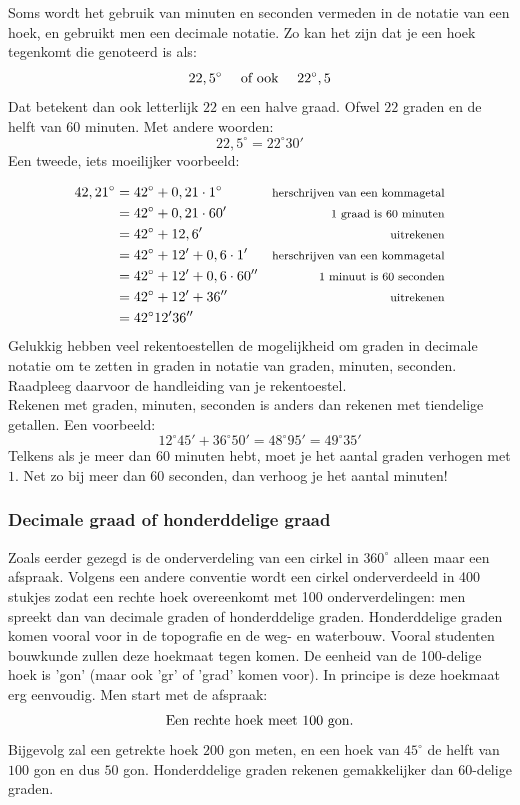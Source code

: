 Soms wordt het gebruik van minuten en seconden vermeden in de notatie van een hoek, en gebruikt men een decimale notatie. Zo kan het zijn dat je een hoek tegenkomt die genoteerd is als:
\[22,5^\circ \quad \textup{ of ook } \quad 22^\circ,5\]
Dat betekent dan ook letterlijk $22$ en een halve graad. Ofwel $22$ graden en de helft van $60$ minuten. Met andere woorden:
\[22,5^\circ = 22^\circ30'\]
Een tweede, iets moeilijker voorbeeld:

\begin{align*}
42,21^\circ &= 42^\circ+0,21\cdot 1^\circ &\textup{\footnotesize herschrijven van een kommagetal}\\
&= 42^\circ + 0,21 \cdot 60' &\textup{\footnotesize 1 graad is 60 minuten}\\
&= 42^\circ + 12,6' &\textup{\footnotesize uitrekenen}\\
&= 42^\circ + 12' + 0,6\cdot 1' &\textup{\footnotesize herschrijven van een kommagetal}\\
&= 42^\circ + 12' + 0,6 \cdot 60'' &\textup{\footnotesize 1 minuut is 60 seconden}\\
&= 42^\circ + 12' + 36'' & \textup{\footnotesize uitrekenen}\\
&= 42^\circ12'36''
\end{align*}
Gelukkig hebben veel rekentoestellen de mogelijkheid om graden in decimale notatie om te zetten in graden in notatie van graden, minuten, seconden. Raadpleeg daarvoor de handleiding van je rekentoestel.\\

Rekenen met graden, minuten, seconden is anders dan rekenen met tiendelige getallen.  Een voorbeeld:
\[12^\circ45'+36^\circ50'=48^\circ95'=49^\circ35'\]
Telkens als je meer dan $60$ minuten hebt, moet je het aantal graden verhogen met $1$. Net zo bij meer dan $60$ seconden, dan verhoog je het aantal minuten!

\subsubsection{Decimale graad of honderddelige graad}

Zoals eerder gezegd is de onderverdeling van een cirkel in $360^\circ$ alleen maar een afspraak. Volgens een andere conventie wordt een cirkel onderverdeeld in 400 stukjes zodat een rechte hoek overeenkomt met 100 onderverdelingen: men spreekt dan van decimale graden of honderddelige graden.
Honderddelige graden komen vooral voor in de topografie en de weg- en waterbouw. Vooral studenten bouwkunde zullen deze hoekmaat tegen komen. De eenheid van de 100-delige hoek is 'gon' (maar ook 'gr' of 'grad' komen voor). In principe is deze hoekmaat erg eenvoudig. Men start met de afspraak:
\[\textup{Een rechte hoek meet 100 gon.}\]
Bijgevolg zal een getrekte hoek $200$ gon meten, en een hoek van $45^\circ$ de helft van $100$ gon en dus $50$ gon. Honderddelige graden rekenen gemakkelijker dan $60$-delige graden.

